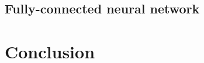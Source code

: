 \documentclass{article}
\begin{document}
\subsection{Fully-connected neural network}



\section{Conclusion}






\end{document}
